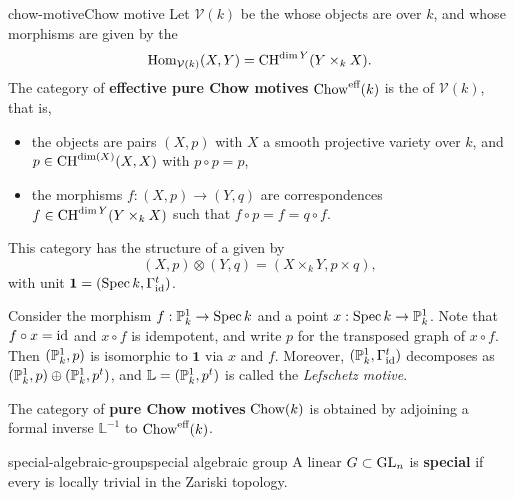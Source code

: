 \begin{topic}{chow-motive}{Chow motive}
    Let $\mathcal{V}(k)$ be the  whose objects are   over $k$, and whose morphisms are given by the 
    \[ \text{Hom}_{\mathcal{V}(k)}(X, Y) = \textup{CH}^{\dim Y}(Y \times_k X) . \]
    The category of \textbf{effective pure Chow motives} $\textup{Chow}^\textup{eff}(k)$ is the  of $\mathcal{V}(k)$, that is,
    \begin{itemize}
        \item the objects are pairs $(X, p)$ with $X$ a smooth projective variety over $k$, and $p \in \textup{CH}^{\dim(X)}(X, X)$ with $p \circ p = p$,
        \item the morphisms $f : (X, p) \to (Y, q)$ are correspondences $f \in \textup{CH}^{\dim Y}(Y \times_k X)$ such that $f \circ p = f = q \circ f$.
    \end{itemize}
    This category has the structure of a  given by
    \[ (X, p) \otimes (Y, q) = (X \times_k Y, p \times q) , \]
    with unit $\textbf{1} = (\operatorname{Spec} k, \Gamma_{\text{id}}^t)$.
    
    Consider the morphism $f : \mathbb{P}^1_k \to \operatorname{Spec} k$ and a point $x : \operatorname{Spec} k \to \mathbb{P}^1_k$. Note that $f \circ x = \text{id}$ and $x \circ f$ is idempotent, and write $p$ for the transposed graph of $x \circ f$. Then $(\mathbb{P}^1_k, p)$ is isomorphic to $\textbf{1}$ via $x$ and $f$. Moreover, $(\mathbb{P}^1_k, \Gamma_{\text{id}}^t)$ decomposes as $(\mathbb{P}^1_k, p) \oplus (\mathbb{P}^1_k, p^t)$, and $\mathbb{L} = (\mathbb{P}^1_k, p^t)$ is called the \textit{Lefschetz motive}.
    
    The category of \textbf{pure Chow motives} $\textup{Chow}(k)$ is obtained by adjoining a formal inverse $\mathbb{L}^{-1}$ to $\textup{Chow}^\textup{eff}(k)$.
\end{topic}

\begin{topic}{special-algebraic-group}{special algebraic group}
    A linear  $G \subset \textup{GL}_n$ is \textbf{special} if every  is locally trivial in the Zariski topology.
\end{topic}

